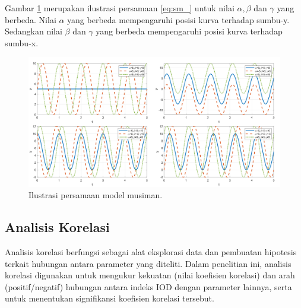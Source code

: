 \begin{spacing}{1.5}
	Gambar \ref{fig:sm} merupakan ilustrasi persamaan \ref{eq:sm_} untuk nilai $\alpha,\beta$ dan $\gamma$ yang berbeda. Nilai $\alpha$ yang berbeda mempengaruhi posisi kurva terhadap sumbu-y. Sedangkan nilai $\beta$ dan $\gamma$ yang berbeda mempengaruhi posisi kurva terhadap sumbu-x.
	\begin{figure}[H]
		\centering
		\includegraphics[width=15cm]{contents/Figures/sm_experiment}
		\caption{Ilustrasi persamaan model musiman.}
		\label{fig:sm}
	\end{figure}
	

	\subsection[Analisis Korelasi]{Analisis Korelasi}
		 Analisis korelasi berfungsi sebagai alat eksplorasi data dan pembuatan hipotesis terkait hubungan antara parameter yang diteliti. Dalam penelitian ini, analisis korelasi digunakan untuk mengukur kekuatan (nilai koefisien korelasi) dan arah (positif/negatif) hubungan antara indeks IOD dengan parameter lainnya, serta untuk menentukan signifikansi koefisien korelasi tersebut.
		

\end{spacing}
